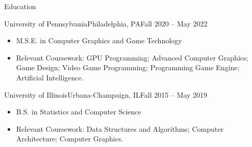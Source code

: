 \documentclass[]{mcdowellcv}
\begin{document}
	\makeheader
	

	\begin{cvsection}{Education}
		\begin{cvsubsection}{University of Pennsylvania}{Philadelphia, PA}{Fall 2020 -- May 2022}
			\begin{itemize}
				\item M.S.E. in Computer Graphics and Game Technology
				\item Relevant Coursework: GPU Programming; Advanced Computer Graphics; Game Design; Video Game Programming; Programming Game Engine; Artificial Intelligence.
			\end{itemize}
		\end{cvsubsection}
		\begin{cvsubsection}{University of Illinois}{Urbana-Champaign, IL}{Fall 2015 -- May 2019}
			\begin{itemize}
				\item B.S. in Statistics and Computer Science
				\item Relevant Coursework: Data Structures and Algorithms; Computer Architecture; Computer Graphics.
			\end{itemize}
		\end{cvsubsection}
	\end{cvsection}
\end{document}
